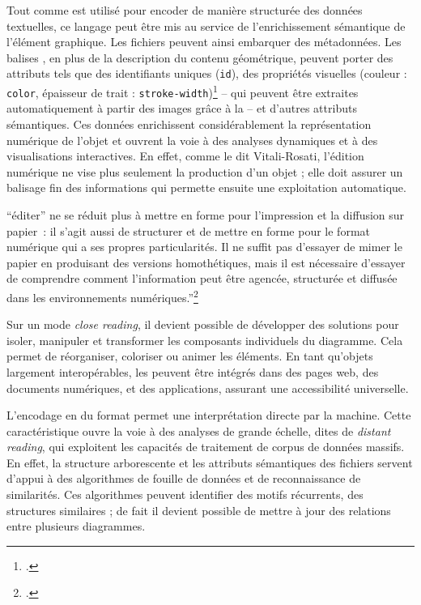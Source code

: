 Tout comme \xml est utilisé pour encoder de manière structurée des
données textuelles, ce langage peut être mis au service de
l'enrichissement sémantique de l'élément graphique. Les fichiers \svg peuvent ainsi embarquer des métadonnées. Les balises \xml, en
plus de la description du contenu géométrique, peuvent porter des
attributs tels que des identifiants uniques (\texttt{id}), des
propriétés visuelles (couleur : \texttt{color}, épaisseur de trait :
\texttt{stroke-width})\footcite{noauthor_reference_2024} -- qui
peuvent être extraites automatiquement à partir des images grâce à la
\cv -- et d'autres attributs sémantiques. Ces données
enrichissent considérablement la représentation numérique de l'objet et
ouvrent la voie à des analyses dynamiques et à des visualisations
interactives. En effet, comme le dit Vitali-Rosati, l'édition numérique ne vise plus seulement la production d'un objet ; elle doit assurer un balisage fin des informations qui permette ensuite une exploitation automatique.

\begin{kwote}
``éditer'' ne se réduit plus à mettre en forme pour l'impression et la diffusion sur papier : il s'agit aussi de structurer et de mettre en forme pour le format numérique qui a ses propres particularités. Il ne suffit pas d'essayer de mimer le papier en produisant des versions homothétiques, mais il est nécessaire d'essayer de comprendre comment l'information peut être agencée, structurée et diffusée dans les environnements numériques.''\footcite[p.104]{epron_ledition_2018}
\end{kwote}

Sur un mode \emph{close reading}, il devient possible de développer des
solutions pour isoler, manipuler et transformer les composants
individuels du diagramme. Cela permet de réorganiser, coloriser ou
animer les éléments. En tant qu'objets largement interopérables, les
\svgs peuvent être intégrés dans des pages web, des documents numériques,
et des applications, assurant une accessibilité universelle.

L'encodage en \xml du format \svg permet une interprétation directe par la
machine. Cette caractéristique ouvre la voie à des analyses de grande
échelle, dites de \emph{distant reading}, qui exploitent les capacités
de traitement de corpus de données massifs. En effet, la structure
arborescente et les attributs sémantiques des fichiers \svg servent
d'appui à des algorithmes de fouille de données et de reconnaissance de
similarités. Ces algorithmes peuvent identifier des motifs récurrents,
des structures similaires ; de fait il devient possible de mettre à jour
des relations entre plusieurs diagrammes.

